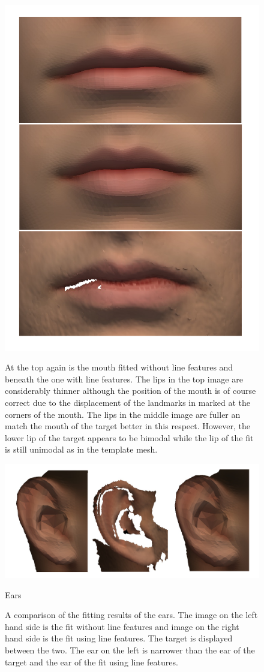 \begin{figure}[h!]
    \centering
    \includegraphics[width=.8\textwidth]{./resources/img/00029_mouth_comparison.pdf}
    \label{fig:00029_mouth_comparison}
    \caption{At the top again is the mouth fitted without line features and beneath the one with line features. The lips in the top image are considerably thinner although the position of the mouth is of course correct due to the displacement of the landmarks in marked at the corners of the mouth. The lips in the middle image are fuller an match the mouth of the target better in this respect. However, the lower lip of the target appears to be bimodal while the lip of the fit is still unimodal as in the template mesh.}
\end{figure}
\pagebreak

\begin{figure}[h!]
    \centering
    \includegraphics[width=\textwidth]{./resources/img/00029_left_ear_comparison.pdf}
\caption{Ears}
\label{fig:fitears}
\caption{A comparison of the fitting results of the ears. The image on the left hand side is the fit without line features and image on the right hand side is the fit using line features. The target is displayed between the two. The ear on the left is narrower than the ear of the target and the ear of the fit using line features.}
\end{figure}

